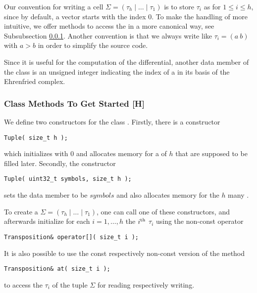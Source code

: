 Our convention for writing a cell $\Sigma = (\tau_h \mid \ldots \mid \tau_1)$ is 
to store $\tau_i$ as  for $1 \leq i \leq h$, since by default, a vector starts with the index $0$. 
To make the handling of  more intuitive, 
we offer methods to access the  in a more canonical way, see Subsubsection \ref{program:kappa:tuple:get_started}. 
Another convention is that we always write  like $\tau_i = (a\ b)$ with $a > b$ in order to simplify the source code.

Since it is useful for the computation of the differential, 
another data member of the class  is an unsigned integer  indicating the index of a  in its basis of the Ehrenfried complex.

\subsubsection{Class Methods To Get Started [H]}
\label{program:kappa:tuple:get_started}

We define two constructors for the class . 
Firstly, there is a constructor
\begin{lstlisting}
Tuple( size_t h );
\end{lstlisting}
which initializes  with $0$ and allocates memory for a  of $h$  
that are supposed to be filled later. 
Secondly, the constructor
\begin{lstlisting}
Tuple( uint32_t symbols, size_t h );
\end{lstlisting}
sets the data member  to be $symbols$ and also allocates memory for the $h$ many . 

To create a  $\Sigma = (\tau_h \mid \ldots \mid \tau_1)$, one can call one of these constructors, 
and afterwards initialize for each $i = 1, \dotsc, h$ the $i^{\text{th}}$  $\tau_i$ using the non-const operator 
\begin{lstlisting}
Transposition& operator[]( size_t i );
\end{lstlisting}
It is also possible to use the const respectively non-const version of the method
\begin{lstlisting}
Transposition& at( size_t i );
\end{lstlisting}
to access the  $\tau_i$ of the tuple $\Sigma$ for reading respectively writing. 

